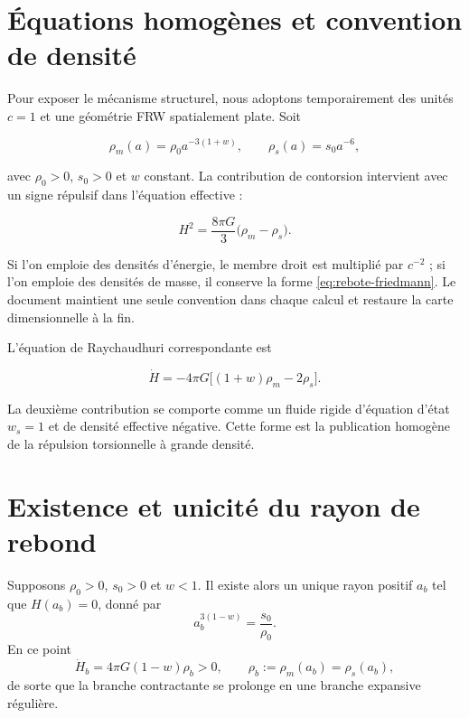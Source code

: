 \section{Équations homogènes et convention de densité}

Pour exposer le mécanisme structurel, nous adoptons temporairement des unités
\(c=1\) et une géométrie FRW spatialement plate. Soit

\begin{equation}
 \rho_m(a)=\rho_0a^{-3(1+w)},
 \qquad
 \rho_s(a)=s_0a^{-6},
 \label{eq:rebote-densities}
\end{equation}

avec \(\rho_0>0\), \(s_0>0\) et \(w\) constant. La contribution de
contorsion intervient avec un signe répulsif dans l'équation effective :

\begin{equation}
 H^2=\frac{8\pi G}{3}\bigl(\rho_m-\rho_s\bigr).
 \label{eq:rebote-friedmann}
\end{equation}

Si l'on emploie des densités d'énergie, le membre droit est multiplié par
\(c^{-2}\) ; si l'on emploie des densités de masse, il conserve la forme
\cref{eq:rebote-friedmann}. Le document maintient une seule convention dans
chaque calcul et restaure la carte dimensionnelle à la fin.

L'équation de Raychaudhuri correspondante est

\begin{equation}
 \dot H=-4\pi G\bigl[(1+w)\rho_m-2\rho_s\bigr].
 \label{eq:rebote-raychaudhuri}
\end{equation}

La deuxième contribution se comporte comme un fluide rigide d'équation
d'état \(w_s=1\) et de densité effective négative. Cette forme est la publication
homogène de la répulsion torsionnelle à grande densité.

\section{Existence et unicité du rayon de rebond}

\begin{theorem}
Supposons \(\rho_0>0\), \(s_0>0\) et \(w<1\). Il existe alors un unique
rayon positif \(a_b\) tel que \(H(a_b)=0\), donné par
\begin{equation}
 \boxed{
 a_b^{3(1-w)}=\frac{s_0}{\rho_0}.}
 \label{eq:rebote-radius}
\end{equation}
En ce point
\begin{equation}
 \boxed{
 \dot H_b=4\pi G(1-w)\rho_b>0,}
 \qquad
 \rho_b:=\rho_m(a_b)=\rho_s(a_b),
 \label{eq:rebote-positive-derivative}
\end{equation}
de sorte que la branche contractante se prolonge en une branche expansive régulière.
\end{theorem}

